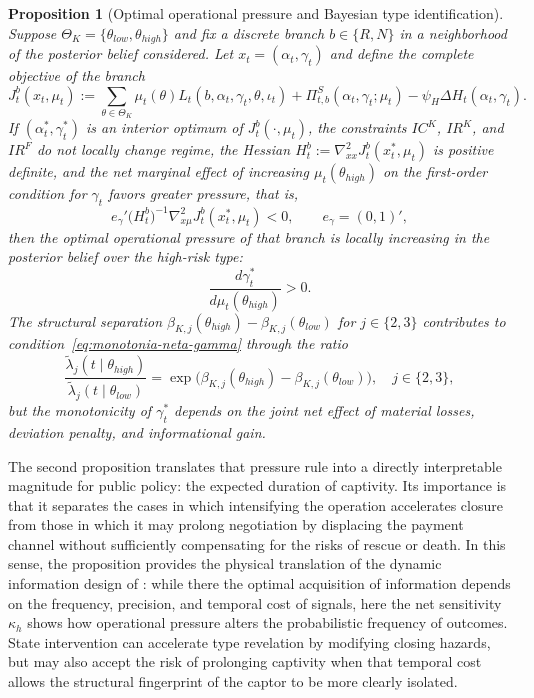 \documentclass[ecta,nameyear,draft]{econsocart}
\theoremstyle{plain}
\newtheorem{proposition}[theorem]{Proposition}
\theoremstyle{definition}
\newcommand{\ThetaK}{\Theta_K}
\newcommand{\1}{\mathbf{1}}
\begin{document}
\begin{proposition}[Optimal operational pressure and Bayesian type identification]
\label{prop:optimal-gamma-beliefs}
Suppose $\ThetaK=\{\theta_{low},\theta_{high}\}$ and fix a discrete branch $b\in\{R,N\}$ in a neighborhood of the posterior belief considered. Let $x_t=(\alpha_t,\gamma_t)$ and define the complete objective of the branch
\begin{equation}
\label{eq:obj-rama-completo}
J_t^b(x_t,\mu_t)
:=
\sum_{\theta\in\ThetaK}\mu_t(\theta)L_t(b,\alpha_t,\gamma_t,\theta,\iota_t)
+\Pi_{t,b}^{S}(\alpha_t,\gamma_t;\mu_t)
-\psi_H\Delta H_t(\alpha_t,\gamma_t).
\end{equation}
If $(\alpha_t^\ast,\gamma_t^\ast)$ is an interior optimum of $J_t^b(\cdot,\mu_t)$, the constraints $IC^K$, $IR^K$, and $IR^F$ do not locally change regime, the Hessian $H_t^b:=\nabla_{xx}^2J_t^b(x_t^\ast,\mu_t)$ is positive definite, and the net marginal effect of increasing $\mu_t(\theta_{high})$ on the first-order condition for $\gamma_t$ favors greater pressure, that is,
\begin{equation}
\label{eq:monotonia-neta-gamma}
e_\gamma'
\bigl(H_t^b\bigr)^{-1}
\nabla_{x\mu}^2J_t^b(x_t^\ast,\mu_t)
<0,
\qquad
e_\gamma=(0,1)',
\end{equation}
then the optimal operational pressure of that branch is locally increasing in the posterior belief over the high-risk type:
\[
\frac{d\gamma_t^\ast}{d\mu_t(\theta_{high})} > 0.
\]
The structural separation $\beta_{K,j}(\theta_{high})-\beta_{K,j}(\theta_{low})$ for $j\in\{2,3\}$ contributes to condition~\eqref{eq:monotonia-neta-gamma} through the ratio
\[
\frac{\tilde\lambda_j(t\mid\theta_{high})}{\tilde\lambda_j(t\mid\theta_{low})}
=\exp\!\bigl(\beta_{K,j}(\theta_{high})-\beta_{K,j}(\theta_{low})\bigr),
\quad j\in\{2,3\},
\]
but the monotonicity of $\gamma_t^\ast$ depends on the joint net effect of material losses, deviation penalty, and informational gain.
\end{proposition}

\noindent The second proposition translates that pressure rule into a directly interpretable magnitude for public policy: the expected duration of captivity. Its importance is that it separates the cases in which intensifying the operation accelerates closure from those in which it may prolong negotiation by displacing the payment channel without sufficiently compensating for the risks of rescue or death. In this sense, the proposition provides the physical translation of the dynamic information design of \citet{Zhong2022}: while there the optimal acquisition of information depends on the frequency, precision, and temporal cost of signals, here the net sensitivity $\kappa_h$ shows how operational pressure alters the probabilistic frequency of outcomes. State intervention can accelerate type revelation by modifying closing hazards, but may also accept the risk of prolonging captivity when that temporal cost allows the structural fingerprint of the captor to be more clearly isolated.
\end{document}
